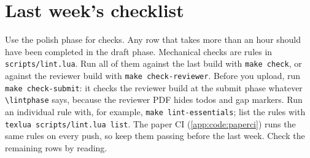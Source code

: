 \section{Last week's checklist}\label{app:lifecycle:polish}
Use the polish phase for checks. Any row that takes more than an hour should have been completed in the draft phase. Mechanical checks are rules in \texttt{scripts/lint.lua}. Run all of them against the last build with \texttt{make check}, or against the reviewer build with \texttt{make check-reviewer}. Before you upload, run \texttt{make check-submit}: it checks the reviewer build at the submit phase whatever \texttt{\textbackslash lintphase} says, because the reviewer PDF hides todos and gap markers. Run an individual rule with, for example, \texttt{make lint-essentials}; list the rules with \texttt{texlua scripts/lint.lua list}. The paper CI (\cref{app:code:paperci}) runs the same rules on every push, so keep them passing before the last week. Check the remaining rows by reading.

